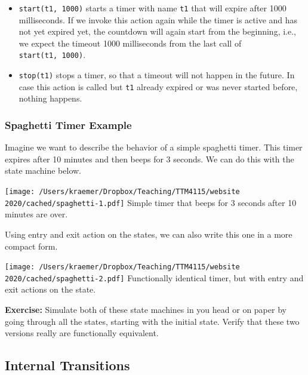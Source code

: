 \documentclass[10pt, twoside, twocolumn]{book}
\providecommand{\tightlist}{%
  \setlength{\itemsep}{0pt}\setlength{\parskip}{0pt}}
\renewcommand{\caption}{}
\let\origfigure=\figure
\let\endorigfigure=\endfigure
\renewenvironment{figure}[1][]{%
  \origfigure[H]
}{%
  \endorigfigure
}
\begin{document}
\begin{itemize}
\tightlist
\item
  \texttt{start(t1,\ 1000)} starts a timer with name \texttt{t1} that
  will expire after 1000 milliseconds. If we invoke this action again
  while the timer is active and has not yet expired yet, the countdown
  will again start from the beginning, i.e., we expect the timeout 1000
  milliseconds from the last call of \texttt{start(t1,\ 1000)}.
\item
  \texttt{stop(t1)} stops a timer, so that a timeout will not happen in
  the future. In case this action is called but \texttt{t1} already
  expired or was never started before, nothing happens.
\end{itemize}

\hypertarget{spaghetti-timer-example}{%
\subsubsection{Spaghetti Timer Example}\label{spaghetti-timer-example}}

Imagine we want to describe the behavior of a simple spaghetti timer.
This timer expires after 10 minutes and then beeps for 3 seconds. We can
do this with the state machine below.

\begin{figure}[htbp]
\begin{center}
\texttt{[image: /Users/kraemer/Dropbox/Teaching/TTM4115/website 2020/cached/spaghetti-1.pdf]}%
\caption{Simple timer that beeps for 3 seconds after 10 minutes are over.}
\label{default}
\end{center}
\end{figure}
Using entry and exit action on the states, we can also write this one in
a more compact form.

\begin{figure}[htbp]
\begin{center}
\texttt{[image: /Users/kraemer/Dropbox/Teaching/TTM4115/website 2020/cached/spaghetti-2.pdf]}%
\caption{Functionally identical timer, but with entry and exit actions on the
state.}
\label{default}
\end{center}
\end{figure}
\textbf{Exercise:} Simulate both of these state machines in you head or
on paper by going through all the states, starting with the initial
state. Verify that these two versions really are functionally
equivalent.

\hypertarget{internal-transitions}{%
\subsection{Internal Transitions}\label{internal-transitions}}
\end{document}
